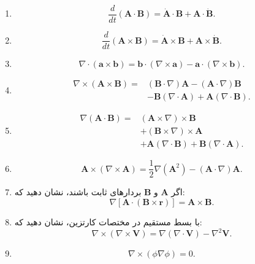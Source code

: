 \documentclass[a4paper,16pt]{article}
\begin{document}
	\begin{enumerate}[label=\textbf{\alph*)}]
		
		\item
		\[
		\frac{d}{dt}(\mathbf{A}\cdot\mathbf{B})
		=
		\dot{\mathbf{A}}\cdot\mathbf{B}
		+
		\mathbf{A}\cdot\dot{\mathbf{B}}.
		\]
		
		\item
		\[
		\frac{d}{dt}(\mathbf{A}\times\mathbf{B})
		=
		\dot{\mathbf{A}}\times\mathbf{B}
		+
		\mathbf{A}\times\dot{\mathbf{B}}.
		\]
		
		\item
		\[
		\nabla\cdot(\mathbf{a}\times\mathbf{b})
		=
		\mathbf{b}\cdot(\nabla\times\mathbf{a})
		-
		\mathbf{a}\cdot(\nabla\times\mathbf{b}).
		\]
		
		\item
		\[
		\begin{aligned}
			\nabla\times(\mathbf{A}\times\mathbf{B})
			={}&
			(\mathbf{B}\cdot\nabla)\mathbf{A}
			-
			(\mathbf{A}\cdot\nabla)\mathbf{B}\\
			&-\mathbf{B}(\nabla\cdot\mathbf{A})
			+\mathbf{A}(\nabla\cdot\mathbf{B}).
		\end{aligned}
		\]
		
		\item
		\[
		\begin{aligned}
			\nabla(\mathbf{A}\cdot\mathbf{B})
			={}&
			(\mathbf{A}\times\nabla)\times\mathbf{B}\\
			&+(\mathbf{B}\times\nabla)\times\mathbf{A}\\
			&+\mathbf{A}(\nabla\cdot\mathbf{B})
			+\mathbf{B}(\nabla\cdot\mathbf{A}).
		\end{aligned}
		\]
		
		\item
		\[
		\mathbf{A}\times(\nabla\times\mathbf{A})
		=
		\frac{1}{2}\nabla(\mathbf{A}^2)
		-
		(\mathbf{A}\cdot\nabla)\mathbf{A}.
		\]
		
		\item اگر \(\mathbf{A}\) و \(\mathbf{B}\) بردارهای ثابت باشند،
		نشان دهید که:
		\[
		\nabla\left[
		\mathbf{A}\cdot(\mathbf{B}\times\mathbf{r})
		\right]
		=
		\mathbf{A}\times\mathbf{B}.
		\]
		
		\item با بسط مستقیم در مختصات کارتزین، نشان دهید که:
		\[
		\nabla\times(\nabla\times\mathbf{V})
		=
		\nabla(\nabla\cdot\mathbf{V})
		-
		\nabla^2\mathbf{V}.
		\]
		
		\item
		\[
		\nabla\times(\phi\nabla\phi)=0.
		\]
		

\end{enumerate}
\end{document}
